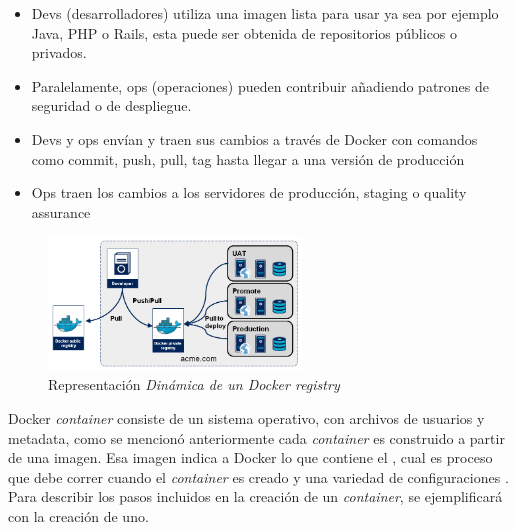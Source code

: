 \documentclass[letter,10pt]{article}
\begin{document}
	\begin{itemize}
		\item Devs (desarrolladores) utiliza una imagen lista para usar ya sea por ejemplo Java, PHP o Rails, esta puede ser obtenida de repositorios públicos o privados.
		\item Paralelamente, ops (operaciones) pueden contribuir añadiendo patrones de seguridad o de despliegue.
		\item Devs y ops envían y traen sus cambios a través de Docker con comandos como commit, push, pull, tag hasta llegar a una versión de producción
		\item Ops traen los cambios a los servidores de producción, staging o quality assurance
	\end{itemize}
	
\begin{figure}[H]
  \centering
  \includegraphics[width=0.6\textwidth]{images/registry-dynamic.png}
    \caption{Representación \textit{Dinámica de un \textit{Docker registry} }}
    \label{fig:dynamic}
\end{figure}	
	
Docker \textit{container} consiste de  un sistema operativo, con archivos de usuarios y metadata, como se mencionó anteriormente cada \textit{container} es construido a partir de una imagen. Esa imagen indica a Docker lo que contiene el \container, cual es proceso que debe correr cuando el  \textit{container} es creado y una variedad de configuraciones \cite{Docker:2015:understanding}. Para describir los pasos incluidos en la creación de un \emph{container}, se ejemplificará con la creación de uno.
\end{document}
